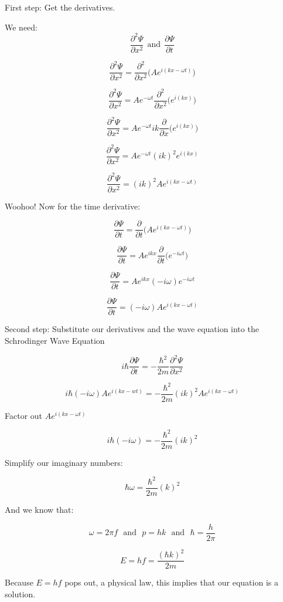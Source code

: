 \documentclass{article}
\begin{document}
First step: 
Get the derivatives.

We need: 
$$
\frac{\partial^{2} \Psi}{\partial x^{2}} \ \ \text{and} \ \ 
\frac{\partial \Psi}{\partial t}
$$

$$
\frac{\partial^{2} \Psi}{\partial x^{2}} = 
\frac{\partial^{2}}{\partial x^{2}} \bigg( A e^{i(kx-\omega t)} \bigg)
$$

$$
\frac{\partial^{2} \Psi}{\partial x^{2}} =
Ae^{-\omega t}\frac{\partial^{2}}{\partial x^{2}} \big( e^{i(kx)} \big)
$$

$$
\frac{\partial^{2} \Psi}{\partial x^{2}} =
Ae^{-\omega t}ik \frac{\partial}{\partial x} \big( e^{i(kx)} \big)
$$

$$
\frac{\partial^{2} \Psi}{\partial x^{2}} =
Ae^{-\omega t} (ik)^{2} e^{i(kx)}
$$

$$
\frac{\partial^{2} \Psi}{\partial x^{2}} =
(ik)^{2} A e^{i(kx- \omega t)}
$$

Woohoo! Now for the time derivative:

$$
\frac{\partial \Psi}{\partial t} =
\frac{\partial }{\partial t} \big( A e^{i(kx- \omega t)} \big)
$$

$$
\frac{\partial \Psi}{\partial t} =
A e^{ikx} \frac{\partial }{\partial t} \big( e^{-i \omega t} \big)
$$

$$
\frac{\partial \Psi}{\partial t} =
A e^{ikx} (-i \omega)  e^{-i \omega t} 
$$

$$
\frac{\partial \Psi}{\partial t} =
(-i \omega )A e^{i(kx- \omega t)}
$$

Second step: 
Substitute our derivatives and the wave equation into the Schrodinger Wave 
Equation

$$
i \hbar \frac{\partial \Psi}{\partial t} =
-\frac{\hbar^2}{2m} \frac{\partial^2 \Psi}{\partial x^2}$$

$$
i \hbar (-i\omega)A e^{i(kx-wt)} =
-\frac{\hbar^2}{2m}(ik)^{2} A e^{i(kx-\omega t)}  
$$

Factor out $A e^{i(kx-\omega t)}$

$$
i \hbar (-i\omega) =
-\frac{\hbar^2}{2m}(ik)^{2}  
$$

Simplify our imaginary numbers:

$$
\hbar \omega =
\frac{\hbar^2}{2m}(k)^{2}  
$$

And we know that:

$$
\omega =
2 \pi f \ \ \ \text{and} \ \ \ p =
hk \ \ \ \text{and} \ \ \ \hbar =
\frac{h}{2\pi}
$$

$$
E = h f = \frac{(\hbar k)^{2}}{2m}
$$

Because $E=hf$ pops out, a physical law, this implies that our equation is a
solution.
\end{document}
